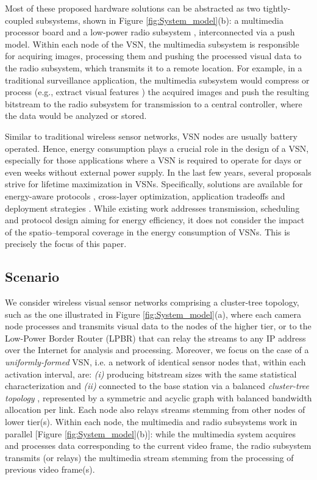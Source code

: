 \documentclass[twocolumn,english]{IEEEtran}
\theoremstyle{plain}
\theoremstyle{definition}
\begin{document}
Most of these proposed hardware solutions can be abstracted as two
tightly-coupled subsystems, shown in Figure \ref{fig:System_model}(b):
a multimedia processor board and a low-power radio subsystem \cite{citric,rahimi2005cyclops,hengstler2007mesheye},
interconnected via a push model. Within each node of the VSN, the
multimedia subsystem is responsible for acquiring images, processing
them and pushing the processed visual data to the radio subsystem,
which transmits it to a remote location. For example, in a traditional
surveillance application, the multimedia subsystem would compress
or process (e.g., extract visual features \cite{DBLP:journals/ijcv/Lowe04,DBLP:conf/MMSP/RedondiBCT})
the acquired images and push the resulting bitstream to the radio
subsystem for transmission to a central controller, where the data
would be analyzed or stored. 

Similar to traditional wireless sensor networks, VSN nodes are usually
battery operated. Hence, energy consumption plays a crucial role in
the design of a VSN, especially for those applications where a VSN
is required to operate for days or even weeks without external power
supply. In the last few years, several proposals strive for lifetime
maximization in VSNs. Specifically, solutions are available for energy-aware
protocols \cite{mingorance2010efficient,LeungMACEssentials}, cross-layer
optimization\cite{Tahir2013701}, application tradeoffs \cite{kandris2011energy}
and deployment strategies \cite{Munishwar:2013:CAV:2489253.2489262}.
While existing work addresses transmission, scheduling and protocol
design aiming for energy efficiency, it does not consider the impact
of the spatio--temporal coverage in the energy consumption of VSNs.
This is precisely the focus of this paper.


\subsection{Scenario}

\noindent We consider wireless visual sensor networks comprising a
cluster-tree topology, such as the one illustrated in Figure \ref{fig:System_model}(a),
where each camera node processes and transmits visual data to the
nodes of the higher tier, or to the Low-Power Border Router (LPBR)
\cite{wang2012IPV6} that can relay the streams to any IP address
over the Internet for analysis and processing. Moreover, we focus
on the case of a \emph{uniformly-formed} VSN, i.e. a network of identical
sensor nodes that, within each activation interval, are: \emph{(i)}
producing bitstream sizes with the same statistical characterization
and \emph{(ii)} connected to the base station via a balanced \emph{cluster-tree
topology }\cite{AlvesClusterTreeGTS}, represented by a symmetric
and acyclic graph with balanced bandwidth allocation per link. Each
node also relays streams stemming from  other nodes of lower tier(s).
Within each node, the multimedia and radio subsystems work in parallel
{[}Figure \ref{fig:System_model}(b){]}: while the multimedia system
acquires and processes data corresponding to the current video frame,
the radio subsystem transmits (or relays) the multimedia stream stemming
from the processing of previous video frame(s).
\end{document}
